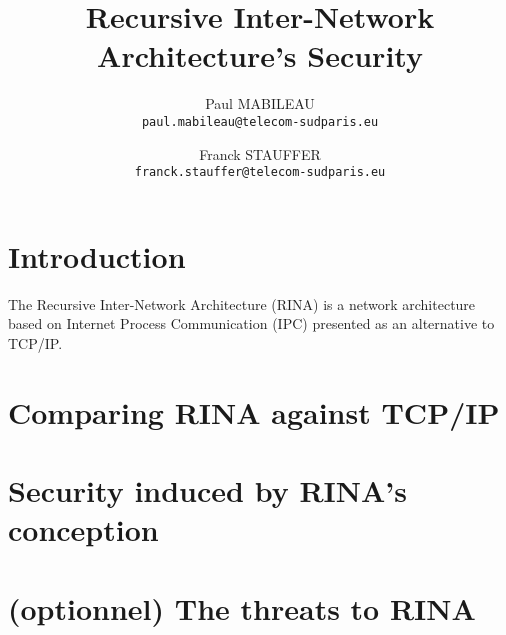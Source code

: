 \documentclass[a4paper]{proc}
\author{Paul MABILEAU\\\texttt{paul.mabileau@telecom-sudparis.eu} \and Franck STAUFFER\\\texttt{franck.stauffer@telecom-sudparis.eu}}
\title{\textbf{Recursive Inter-Network Architecture's Security}}
\begin{document}
\maketitle
\tableofcontents
\part*{Introduction}
The Recursive Inter-Network Architecture (RINA) is a network architecture based on Internet Process Communication
(IPC) presented as an alternative to TCP/IP.

\part{Comparing RINA against TCP/IP}

\part{Security induced by RINA's conception}

\part{(optionnel) The threats to RINA}

\nocite{*}


\end{document}
